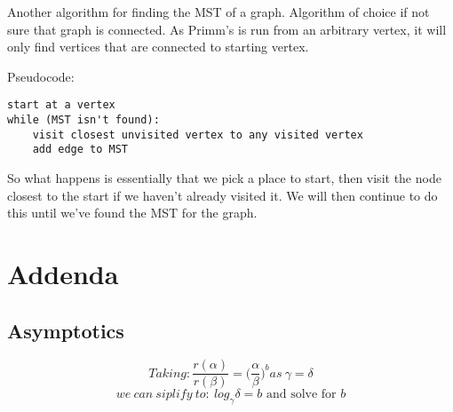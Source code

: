 \documentclass[12pt, letterpaper]{article}
\begin{document}
Another algorithm for finding the MST of a graph. Algorithm of choice if not sure that graph is connected. As Primm's is run from an arbitrary vertex, it will only find vertices that are connected to starting vertex. 

Pseudocode:
\begin{verbatim}
start at a vertex
while (MST isn't found):
    visit closest unvisited vertex to any visited vertex
    add edge to MST
\end{verbatim}
So what happens is essentially that we pick a place to start, then visit the node closest to the start if we haven't already visited it. We will then continue to do this until we've found the MST for the graph.
\section{Addenda}
\subsection{Asymptotics}

\begin{equation}
Taking:
\frac{r(\alpha)}{r(\beta)} = \bigg(\frac{\alpha}{\beta}\bigg)^b as\ \gamma = \delta
\end{equation}
\begin{equation}
we\ can\ siplify\ to:\ log_\gamma \delta = b \textrm{ and solve for $b$}
\end{equation}
\end{document}
